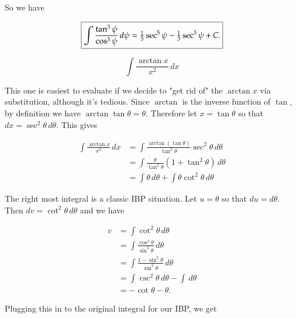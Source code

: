 \documentclass[12pt, letterpaper]{article}
\begin{document}
So we have

\begin{equation*}
\boxed
{
\int \frac{\tan^3{\psi}}{\cos^3{\psi}} \, d\psi
  = \tfrac{1}{5}\sec^5{\psi} - \tfrac{1}{3}\sec^3{\psi} + C. \\[0.2in]
}
\end{equation*}









\newpage

$$ \int \frac{\arctan{x}}{x^2} \, dx $$

This one is easiest to evaluate if we decide to "get rid of" the $\arctan{x}$ via substitution, although it's tedious. Since $\arctan$ is the inverse function of $\tan$, by definition we have $\arctan{\tan{\theta}} = \theta$. Therefore let $x = \tan{\theta}$ so that $dx = \sec^2{\theta}\, d\theta$. This gives

\begin{equation*}
\begin{aligned}
\int \frac{\arctan{x}}{x^2} \, dx
  &= \int \frac{\arctan{\left( \tan{\theta} \right) }}{\tan^2{\theta}} \sec^2{\theta} \, d\theta \\[0.2in]
  &= \int \frac{\theta}{\tan^2{\theta}} \left( 1 + \tan^2{\theta} \right) \, d\theta \\[0.2in]
  &= \int \theta \, d\theta + \int \theta \cot^2{\theta} \, d\theta
\end{aligned}
\end{equation*}

The right most integral is a classic IBP situation. Let $u = \theta$ so that $du = d\theta$. Then $dv = \cot^2{\theta} \, d\theta$ and we have

\begin{equation*}
\begin{aligned}
v
  &= \int \cot^2{\theta} \, d\theta \\[0.2in]
  &= \int \frac{\cos^2{\theta}}{\sin^2{\theta}} \, d\theta \\[0.2in]
  &= \int \frac{1 - \sin^2{\theta}}{\sin^2{\theta}} \, d\theta \\[0.2in]
  &= \int \csc^2{\theta} \, d\theta - \int \, d\theta \\[0.2in]
  &= -\cot{\theta} - \theta.
\end{aligned}
\end{equation*}

Plugging this in to the original integral for our IBP, we get
\end{document}
